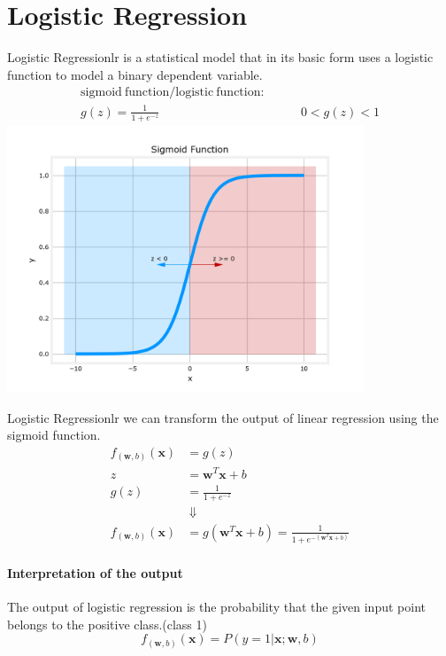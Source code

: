 \section{Logistic Regression}
\begin{dfnbox}{Logistic Regression}{lr}
    \hspace{2em} is a statistical model that in its basic form uses a logistic function
    to model a binary dependent variable.
    \begin{align}
        \mathrm{sigmoid\ function / logistic\ function:}& \nonumber\\
        g(z) = \frac{1}{1 + e^{-z}}& \qquad 0 < g(z) < 1
    \end{align}
    \centering
    \includegraphics*[width=0.8\textwidth]{images/Figure 4}
\end{dfnbox}

\begin{thmbox}{Logistic Regression}{lr}
    \hspace{2em}we can transform the output of linear regression using the sigmoid function.
    \begin{align*}
        f_{(\mathbf{w}, b)}(\mathbf{x}) &= g(z) \\
        z &= \mathbf{w}^T \mathbf{x} + b \\
        g(z) &= \frac{1}{1 + e^{-z}}\\
        & \ \Downarrow\\
        f_{(\mathbf{w}, b)}(\mathbf{x}) &= g(\mathbf{w}^T \mathbf{x} + b) = \frac{1}{1 + e^{-(\mathbf{w}^T \mathbf{x} + b)}}
    \end{align*}
\end{thmbox}

\paragraph*{Interpretation of the output}
The output of logistic regression is the probability that 
the given input point belongs to the positive class.(class 1)\\
\begin{equation}
    f_{(\mathbf{w}, b)}(\mathbf{x}) = P(y = 1 | \mathbf{x}; \mathbf{w}, b)
\end{equation}

